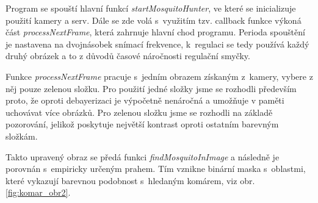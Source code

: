 \documentclass[a4paper,10pt]{article}
\begin{document}
		Program se spouští hlavní funkcí \textit{startMosquitoHunter}, ve které se inicializuje 
		použití kamery a serv.
		Dále se zde volá s~využitím tzv. callback funkce výkoná část \textit{processNextFrame}, která zahrnuje hlavní chod
		programu. Perioda spouštění je nastavena na dvojnásobek snímací frekvence, k~regulaci se tedy používá každý druhý obrázek a to z důvodů časové náročnosti regulační smyčky.

		Funkce \textit{processNextFrame} pracuje s~jedním obrazem získaným z~kamery, vybere z něj pouze zelenou složku.
		Pro použití jedné složky jsme se rozhodli především proto, že oproti debayerizaci je výpočetně nenáročná a 
		umožňuje v paměti uchovávat více obrázků. Pro zelenou složku jsme se rozhodli na základě pozorování, 
		jelikož poskytuje největší kontrast oproti ostatním barevným složkám.

		Takto upravený obraz se předá funkci \textit{findMosquitoInImage} a 
		následně je porovnán s~empiricky určeným prahem.
		Tím vznikne binární maska s~oblastmi, které vykazují barevnou podobnost s~hle\-da\-ným komárem, viz obr. \ref{fig:komar_obr2}.
\end{document}
